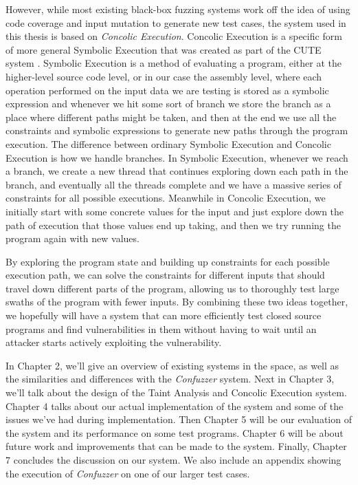 However, while most existing black-box fuzzing systems work off the idea of
using code coverage and input mutation to generate new test cases, the system
used in this thesis is based on \textit{Concolic Execution}. Concolic Execution
is a specific form of more general Symbolic Execution that was created as part
of the CUTE system \cite{cutesystem}. Symbolic Execution is a method of
evaluating a program, either at the higher-level source code level, or in our
case the assembly level, where each operation performed on the input data we are
testing is stored as a symbolic expression and whenever we hit some sort of
branch we store the branch as a place where different paths might be taken, and
then at the end we use all the constraints and symbolic expressions to generate
new paths through the program execution. The difference between ordinary
Symbolic Execution and Concolic Execution is how we handle branches. In Symbolic
Execution, whenever we reach a branch, we create a new thread that continues
exploring down each path in the branch, and eventually all the threads complete
and we have a massive series of constraints for all possible
executions. Meanwhile in Concolic Execution, we initially start with some
concrete values for the input and just explore down the path of execution that
those values end up taking, and then we try running the program again with new
values.

By exploring the program state and building up constraints for each possible
execution path, we can solve the constraints for different inputs that should
travel down different parts of the program, allowing us to thoroughly test
large swaths of the program with fewer inputs. By combining these two ideas
together, we hopefully will have a system that can more efficiently test closed
source programs and find vulnerabilities in them without having to wait until an
attacker starts actively exploiting the vulnerability.

In Chapter 2, we'll give an overview of existing systems in the space, as well
as the similarities and differences with the \textit{Confuzzer} system. Next in
Chapter 3, we'll talk about the design of the Taint Analysis and Concolic
Execution system. Chapter 4 talks about our actual implementation of the system
and some of the issues we've had during implementation. Then Chapter 5 will be
our evaluation of the system and its performance on some test programs. Chapter
6 will be about future work and improvements that can be made to the
system. Finally, Chapter 7 concludes the discussion on our system. We also
include an appendix showing the execution of \textit{Confuzzer} on one of our
larger test cases.
